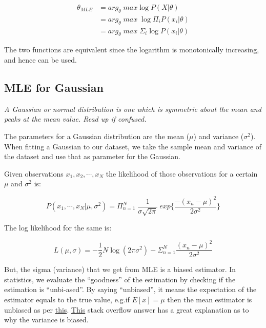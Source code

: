 \begin{equation}
\begin{split}
    \theta_{MLE} &= arg_{\theta} \; max \log P(X|\theta) \\
    &= arg_{\theta}\; max \; \log \Pi_{i} P(x_i | \theta) \\
    &= arg_{\theta}\; max \; \Sigma_i \log P(x_i | \theta)
\end{split}
\end{equation}

The two functions are equivalent since the logarithm is monotonically increasing, and hence can be used.

\subsection{MLE for Gaussian}

\textit{A Gaussian or normal distribution is one which is symmetric about the mean and peaks at the mean value. Read up if confused.}

The parameters for a Gaussian distribution are the mean ($\mu$) and variance ($\sigma^2$). When fitting a Gaussian to our dataset, we take the sample mean and variance of the dataset and use that as parameter for the Gaussian. 

Given observations $x_1, x_2, \cdots, x_N$ the likelihood of those observations for a certain $\mu$ and $\sigma^2$ is:

\begin{equation}
    P(x_1, \cdots, x_N | \mu, \sigma^2) = \Pi_{n=1}^{N} \; \frac{1}{\sigma\sqrt{2\pi}} \: exp\{\frac{-(x_n-\mu)^2}{2\sigma^2}\}
\end{equation}

The log likelihood for the same is:

\begin{equation}
    L(\mu, \sigma) = -\frac{1}{2}N\log(2\pi \sigma^2) - \Sigma_{n=1}^{N} \frac{(x_n - \mu)^2}{2\sigma^2}
\end{equation}

But, the sigma (variance) that we get from MLE is a biased estimator. In statistics, we evaluate the “goodness” of the estimation by checking if the estimation is “unbi-ased”. By saying “unbiased”, it means the expectation of the estimator equals to the true value, e.g.if $E[x] = \mu$ then the mean estimator is unbiased as per \href{https://dawenl.github.io/files/mle_biased.pdf}{this}. \href{https://stats.stackexchange.com/questions/136673/how-to-understand-that-mle-of-variance-is-biased-in-a-gaussian-distribution}{This} stack overflow answer has a great explanation as to why the variance is biased.

